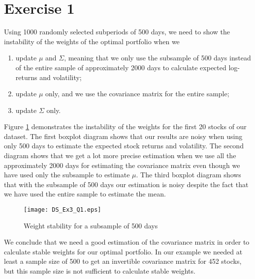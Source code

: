 
\section*{Exercise 1}

Using 1000 randomly selected subperiods of 500 days, we need to show the instability of the weights of the optimal portfolio when we
\begin{enumerate}
\item update $\mu$ and $\Sigma$, meaning that we only use the subsample of 500 days instead of the entire sample of approximately 2000 days to calculate expected log-returns and volatility; 
\item update $\mu$ only, and we use the covariance matrix for the entire sample;
\item update $\Sigma$ only.
\end{enumerate}

Figure \ref{fig1} demonstrates the instability of the weights for the first 20 stocks of our dataset. The first boxplot diagram shows that our results are noisy when using only 500 days to estimate the expected stock returns and volatility. The second diagram shows that we get a lot more precise estimation when we use all the approximately 2000 days for estimating the covariance matrix even though we have used only the subsample to estimate $\mu$. The third boxplot diagram shows that with the subsample of 500 days our estimation is noisy despite the fact that we have used the entire sample to estimate the mean. 

\begin{figure}[H]
\texttt{[image: DS\_Ex3\_Q1.eps]}
\caption{Weight stability for a subsample of 500 days}
\label{fig1}
\end{figure}

We conclude that we need a good estimation of the covariance matrix in order to calculate stable weights for our optimal portfolio. In our example we needed at least a sample size of 500 to get an invertible covariance matrix for 452 stocks, but this sample size is not sufficient to calculate stable weights.  
 

